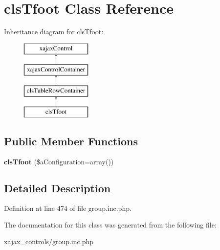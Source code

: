 \hypertarget{classclsTfoot}{
\section{clsTfoot Class Reference}
\label{classclsTfoot}
}
Inheritance diagram for clsTfoot:\begin{figure}[H]
\begin{center}
\leavevmode
\includegraphics[height=4.000000cm]{classclsTfoot}
\end{center}
\end{figure}
\subsection*{Public Member Functions}
\begin{DoxyCompactItemize}
\item 
\hypertarget{classclsTfoot_a7de0d9a4019d3caf31b90ca4669d21b2}{
{\bfseries clsTfoot} (\$aConfiguration=array())}
\label{classclsTfoot_a7de0d9a4019d3caf31b90ca4669d21b2}

\end{DoxyCompactItemize}


\subsection{Detailed Description}


Definition at line 474 of file group.inc.php.



The documentation for this class was generated from the following file:\begin{DoxyCompactItemize}
\item 
xajax\_\-controls/group.inc.php\end{DoxyCompactItemize}
